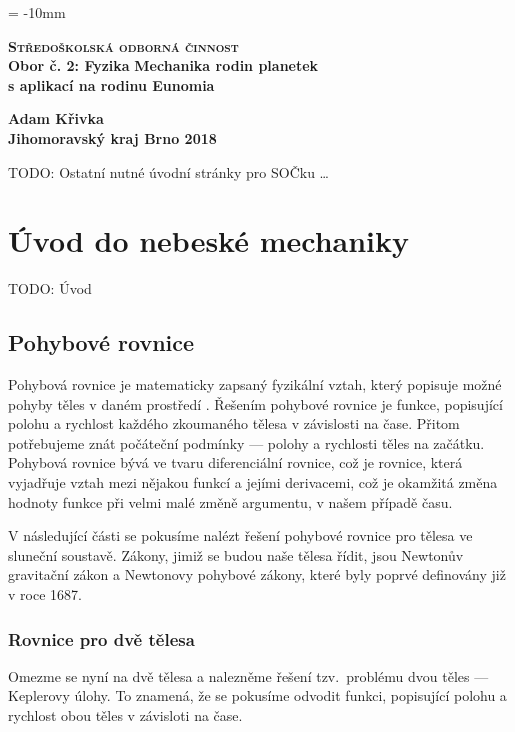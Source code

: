 \documentclass[A4paper, 12pt, oneside]{book}
\newcommand{\B}[1]{\textbf{#1}}
\renewcommand{\S}[1]{\textsc{#1}}
\begin{document}
\voffset = -10mm
\begin{center}
	{\LARGE \B{\S{Středoškolská odborná činnost}}} \\
	{\large \B{{Obor č. 2: Fyzika}}}
	\vfill
	{\Huge \B{Mechanika rodin planetek \\ s aplikací na rodinu Eunomia}}
\end{center}
	\vfill
{\large \bfseries Adam Křivka \\
	Jihomoravský kraj \hfill Brno 2018}

\newpage

TODO: Ostatní nutné úvodní stránky pro SOČku \ldots

\newpage
\tableofcontents
\newpage

\chapter{Úvod do nebeské mechaniky}
TODO: Úvod
\vspace{40mm}
\section{Pohybové rovnice}
Pohybová rovnice je matematicky zapsaný fyzikální vztah, který popisuje možné pohyby těles v daném prostředí \cite{wiki:eqm}. Řešením pohybové rovnice je funkce, popisující polohu a rychlost každého zkoumaného tělesa v závislosti na čase. Přitom potřebujeme znát počáteční podmínky --- polohy a rychlosti těles na začátku. Pohybová rovnice bývá ve tvaru diferenciální rovnice, což je rovnice, která vyjadřuje vztah mezi nějakou funkcí a jejími derivacemi, což je okamžitá změna hodnoty funkce při velmi malé změně argumentu, v našem případě času. 

V následující části se pokusíme nalézt řešení pohybové rovnice pro tělesa ve sluneční soustavě. Zákony, jimiž se budou naše tělesa řídit, jsou Newtonův gravitační zákon a Newtonovy pohybové zákony, které byly poprvé definovány již v roce 1687.
\subsection{Rovnice pro dvě tělesa} \label{sec:2body}
Omezme se nyní na dvě tělesa a nalezněme řešení tzv.\ problému dvou těles --- Keplerovy úlohy. To znamená, že se pokusíme odvodit funkci, popisující polohu a rychlost obou těles v závisloti na čase. 
\end{document}
